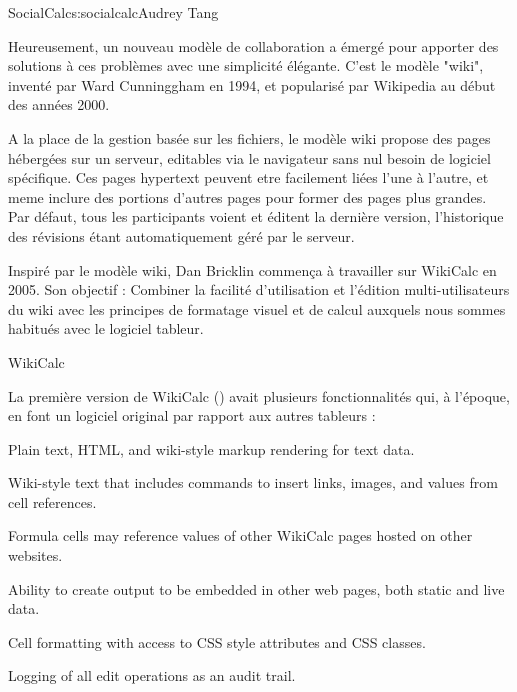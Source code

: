 \begin{aosachapter}{SocialCalc}{s:socialcalc}{Audrey Tang}
\begin{aosaitemize}
\end{aosaitemize}

Heureusement, un nouveau modèle de collaboration a émergé pour apporter des solutions à ces problèmes avec une simplicité élégante.  C'est le modèle "wiki", inventé par Ward Cunninggham en 1994, et popularisé par Wikipedia au début des années 2000.

A la place de la gestion basée sur les fichiers, le modèle wiki propose des pages hébergées sur un serveur, editables via le navigateur sans nul besoin de logiciel spécifique.  Ces pages hypertext peuvent etre facilement liées l'une à l'autre, et meme inclure des portions d'autres pages pour former des pages plus grandes.  Par défaut, tous les participants voient et éditent la dernière version, l'historique des révisions étant automatiquement géré par le serveur. 

Inspiré par le modèle wiki, Dan Bricklin commença à travailler sur WikiCalc en 2005.  Son objectif : Combiner la facilité d'utilisation et l'édition multi-utilisateurs du wiki avec les principes de formatage visuel et de calcul auxquels nous sommes habitués avec le logiciel tableur.

\begin{aosasect1}{WikiCalc}

La première version de WikiCalc () avait plusieurs fonctionnalités qui, à l'époque, en font un logiciel original par rapport aux autres tableurs :

\begin{aosaitemize}

  \item Plain text, HTML, and wiki-style markup rendering for text data.

  \item Wiki-style text that includes commands to insert links, images,
  and values from cell references.

  \item Formula cells may reference values of other WikiCalc pages
  hosted on other websites.

  \item Ability to create output to be embedded in other web pages, both
  static and live data.

  \item Cell formatting with access to CSS style attributes and CSS
  classes.

  \item Logging of all edit operations as an audit trail.


\end{aosaitemize}
\end{aosasect1}
\end{aosachapter}
